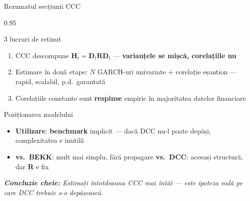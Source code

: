 \documentclass[9pt, aspectratio=169, t]{beamer}
\begin{document}
\begin{frame}{Rezumatul secțiunii CCC}
    \begin{cminipage}{0.95\textwidth}
    {\footnotesize
    \begin{block}{3 lucruri de reținut}
        \begin{enumerate}\setlength{\itemsep}{2pt}
            \item CCC descompune $\mathbf{H}_t = \mathbf{D}_t\mathbf{R}\mathbf{D}_t$ --- \textbf{varianțele se mișcă, corelațiile nu}
            \item Estimare în două etape: $N$ GARCH-uri univariate + corelație eșantion --- rapid, scalabil, p.d.\ garantată
            \item Corelațiile constante sunt \textbf{respinse} empiric în majoritatea datelor financiare
        \end{enumerate}
    \end{block}
    \begin{alertblock}{Poziționarea modelului}
        \begin{itemize}\setlength{\itemsep}{0pt}
            \item \textbf{Utilizare}: \textbf{benchmark} implicit --- dacă DCC nu-l poate depăși, complexitatea e inutilă
            \item \textbf{vs.\ BEKK}: mult mai simplu, fără propagare \quad \textbf{vs.\ DCC}: aceeași structură, dar $\mathbf{R}$ e fix
        \end{itemize}
    \end{alertblock}
    \vspace{1mm}
    \textit{\textbf{Concluzie cheie:} Estimați întotdeauna CCC mai întâi --- este ipoteza nulă pe care DCC trebuie s-o depășească.}
    }
    \end{cminipage}
\end{frame}

\end{document}
